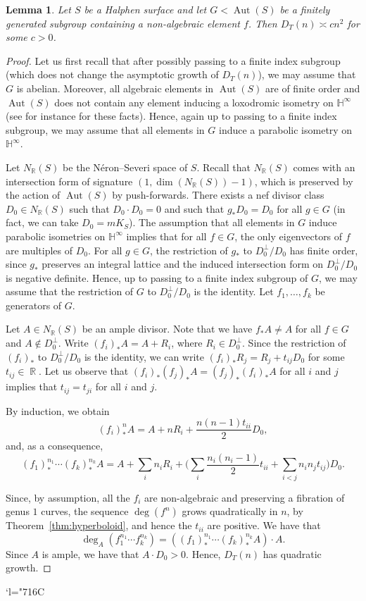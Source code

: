 \documentclass[JEP,XML,SOM,Unicode, NoEqCountersInSection,published]{cedram}
\newcommand{\Changelback}{\mathcode`l="716C}
\newcommand{\h}{\operatorname{\mathbb{H}^{\infty}}}
\newcommand{\R}{\operatorname{\mathbb{R}}}
\newcommand{\Aut}{\operatorname{Aut}}
\theoremstyle{plain}
\newtheorem{lemma}[theorem]{Lemma}
\theoremstyle{definition}
\begin{document}
\begin{lemma}\label{lem:halphen}
Let $S$ be a Halphen surface and let $G<\Aut(S)$ be a finitely generated subgroup containing a non-algebraic element $f$. Then $D_T(n)\asymp cn^2$ for some $c>0$.
\end{lemma}

\begin{proof}
Let us first recall that after possibly passing to a finite index subgroup (which does not change the asymptotic growth of $D_T(n)$), we may assume that $G$ is abelian. Moreover, all algebraic elements in $\Aut(S)$ are of finite order and $\Aut(S)$ does not contain any element inducing a loxodromic isometry on $\h$ (see for instance \cite{cantat2015cremona} for these facts). Hence, again up to passing to a finite index subgroup, we may assume that all elements in $G$ induce a parabolic isometry on~$\h$.

Let $N_{\mathbb{R}}(S)$ be the Néron--Severi space of $S$. Recall that $N_{\mathbb{R}}(S)$ comes with an intersection form of signature $(1,\dim(N_{\mathbb{R}}(S))-1)$, which is preserved by the action of $\Aut(S)$ by push-forwards. There exists a nef divisor class $D_0\in N_{\mathbb{R}}(S)$ such that $D_0\cdot D_0=0$ and such that $g_*D_0=D_0$ for all $g\in G$ (in fact, we can take $D_0=mK_S$). The assumption that all elements in $G$ induce parabolic isometries on $\h$ implies that for all $f\in G$, the only eigenvectors of $f$ are multiples of $D_0$. For all $g\in G$, the restriction of $g_*$ to $D_0^\perp/D_0$ has finite order, since $g_*$ preserves an integral lattice and the induced intersection form on $D_0^\perp/D_0$ is negative definite. Hence, up to passing to a finite index subgroup of $G$, we may assume that the restriction of $G$ to $D_0^\perp/D_0$ is the identity. Let $f_1,\dots, f_k$ be generators of $G$.

Let $A\in N_{\mathbb{R}}(S)$ be an ample divisor. Note that we have $f_*A\neq A$ for all $f\in G$ and $A\notin D_0^\perp$. Write $(f_i)_*A=A+R_i$, where $R_i\in D_0^\perp$. Since the restriction of $(f_i)_*$ to $D_0^\perp/D_0$ is the identity, we can write $(f_i)_*R_j=R_j+t_{ij}D_0$ for some $t_{ij}\in\R$. Let us observe that $(f_i)_*(f_j)_*A=(f_j)_*(f_i)_*A$ for all $i$ and $j$ implies that $t_{ij}=t_{ji}$ for all $i$ and $j$.

By induction, we obtain\vspace*{-3pt}
\[
(f_i)^n_*A=A+nR_i+\frac{n(n-1)t_{ii}}{2}D_0,
\]
and, as a consequence,\vspace*{-3pt}
\[
(f_1)^{n_1}_*\cdots (f_k)^{n_k}_*A=A+\sum_in_iR_i+\biggl(\sum_i\frac{n_i(n_i-1)}{2}t_{ii}+\sum_{i<j}n_in_jt_{ij}\biggr)D_0.
\]

Since, by assumption, all the $f_i$ are non-algebraic and preserving a fibration of genus $1$ curves, the sequence $\deg(f^n)$ grows quadratically in $n$, by Theorem~\ref{thm:hyperboloid}, and hence the $t_{ii}$ are positive. We have that
\[
\deg_A(f_1^{n_1}\cdots f_k^{n_k})=((f_1)^{n_1}_*\cdots (f_k)^{n_k}_*A)\cdot A.
\]
Since $A$ is ample, we have that $A\cdot D_0>0$. Hence, $D_T(n)$ has quadratic growth.
\end{proof}
\Changelback

\backmatter


\end{document}
